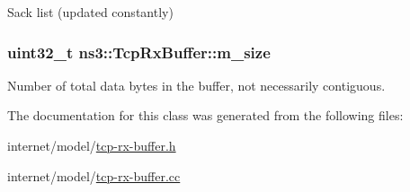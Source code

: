 Sack list (updated constantly) 

\subsubsection[{\texorpdfstring{m\+\_\+size}{m_size}}]{\setlength{\rightskip}{0pt plus 5cm}uint32\+\_\+t ns3\+::\+Tcp\+Rx\+Buffer\+::m\+\_\+size\hspace{0.3cm}{\ttfamily [private]}}\hypertarget{classns3_1_1TcpRxBuffer_ad76a9d93027823422039c92e85d5d4ea}{}\label{classns3_1_1TcpRxBuffer_ad76a9d93027823422039c92e85d5d4ea}


Number of total data bytes in the buffer, not necessarily contiguous. 



The documentation for this class was generated from the following files\+:\begin{DoxyCompactItemize}
\item 
internet/model/\hyperlink{tcp-rx-buffer_8h}{tcp-\/rx-\/buffer.\+h}\item 
internet/model/\hyperlink{tcp-rx-buffer_8cc}{tcp-\/rx-\/buffer.\+cc}\end{DoxyCompactItemize}
